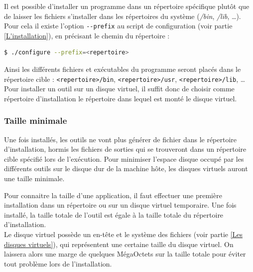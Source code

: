 Il est possible d'installer un programme dans un répertoire spécifique plutôt que de laisser les fichiers s'installer dans les répertoires du système (\textit{/bin}, \textit{/lib}, \ldots).
Pour cela il existe l'option \lstinline{--prefix} au script de configuration (voir partie \ref{L'installation}), en précisant le chemin du répertoire :
\begin{lstlisting}[language = sh]
$ ./configure --prefix=<repertoire>
\end{lstlisting}
Ainsi les différents fichiers et exécutables du programme seront placés dans le répertoire cible : \lstinline{<repertoire>/bin}, \lstinline{<repertoire>/usr}, \lstinline{<repertoire>/lib}, \ldots
\\


Pour installer un outil sur un disque virtuel, il suffit donc de choisir comme répertoire d'installation le répertoire dans lequel est monté le disque virtuel.
\\




\subsubsection{Taille minimale}

Une fois installés, les outils ne vont plus générer de fichier dans le répertoire d'installation, hormis les fichiers de sorties qui se trouveront dans un répertoire cible spécifié lors de l'exécution.
Pour minimiser l'espace disque occupé par les différents outils sur le disque dur de la machine hôte, les disques virtuels auront une taille minimale.

Pour connaitre la taille d'une application, il faut effectuer une première installation dans un répertoire ou sur un disque virtuel temporaire.
Une fois installé, la taille totale de l'outil est égale à la taille totale du répertoire d'installation.
\\


Le disque virtuel possède un en-tête et le système des fichiers (voir partie \ref{Les disques virtuels}), qui représentent une certaine taille du disque virtuel.
On laissera alors une marge de quelques MégaOctets sur la taille totale pour éviter tout problème lors de l'installation.
\\





